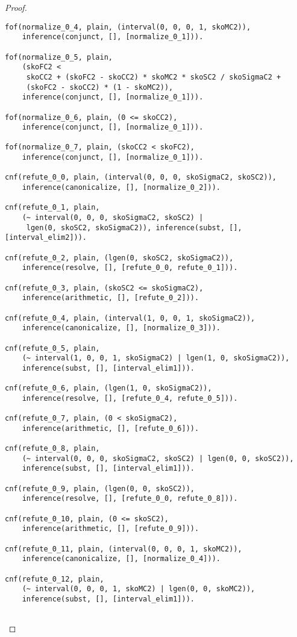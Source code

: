 \begin{proof}
\begin{verbatim}
fof(normalize_0_4, plain, (interval(0, 0, 0, 1, skoMC2)),
    inference(conjunct, [], [normalize_0_1])).

fof(normalize_0_5, plain,
    (skoFC2 <
     skoCC2 + (skoFC2 - skoCC2) * skoMC2 * skoSC2 / skoSigmaC2 +
     (skoFC2 - skoCC2) * (1 - skoMC2)),
    inference(conjunct, [], [normalize_0_1])).

fof(normalize_0_6, plain, (0 <= skoCC2),
    inference(conjunct, [], [normalize_0_1])).

fof(normalize_0_7, plain, (skoCC2 < skoFC2),
    inference(conjunct, [], [normalize_0_1])).

cnf(refute_0_0, plain, (interval(0, 0, 0, skoSigmaC2, skoSC2)),
    inference(canonicalize, [], [normalize_0_2])).

cnf(refute_0_1, plain,
    (~ interval(0, 0, 0, skoSigmaC2, skoSC2) |
     lgen(0, skoSC2, skoSigmaC2)), inference(subst, [], [interval_elim2])).

cnf(refute_0_2, plain, (lgen(0, skoSC2, skoSigmaC2)),
    inference(resolve, [], [refute_0_0, refute_0_1])).

cnf(refute_0_3, plain, (skoSC2 <= skoSigmaC2),
    inference(arithmetic, [], [refute_0_2])).

cnf(refute_0_4, plain, (interval(1, 0, 0, 1, skoSigmaC2)),
    inference(canonicalize, [], [normalize_0_3])).

cnf(refute_0_5, plain,
    (~ interval(1, 0, 0, 1, skoSigmaC2) | lgen(1, 0, skoSigmaC2)),
    inference(subst, [], [interval_elim1])).

cnf(refute_0_6, plain, (lgen(1, 0, skoSigmaC2)),
    inference(resolve, [], [refute_0_4, refute_0_5])).

cnf(refute_0_7, plain, (0 < skoSigmaC2),
    inference(arithmetic, [], [refute_0_6])).

cnf(refute_0_8, plain,
    (~ interval(0, 0, 0, skoSigmaC2, skoSC2) | lgen(0, 0, skoSC2)),
    inference(subst, [], [interval_elim1])).

cnf(refute_0_9, plain, (lgen(0, 0, skoSC2)),
    inference(resolve, [], [refute_0_0, refute_0_8])).

cnf(refute_0_10, plain, (0 <= skoSC2),
    inference(arithmetic, [], [refute_0_9])).

cnf(refute_0_11, plain, (interval(0, 0, 0, 1, skoMC2)),
    inference(canonicalize, [], [normalize_0_4])).

cnf(refute_0_12, plain,
    (~ interval(0, 0, 0, 1, skoMC2) | lgen(0, 0, skoMC2)),
    inference(subst, [], [interval_elim1])).


\end{verbatim}
\end{proof}
